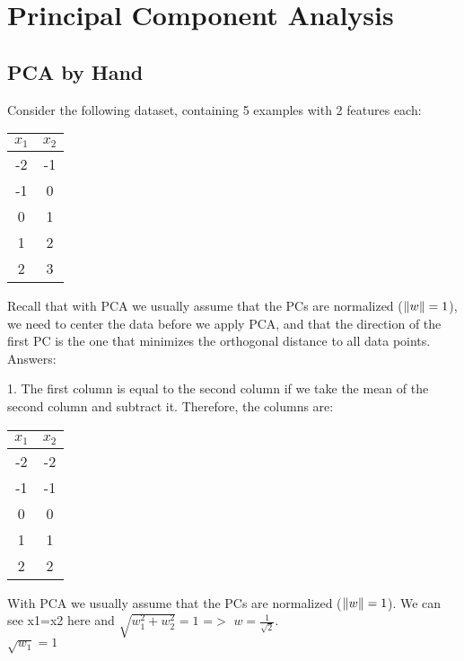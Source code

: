 \documentclass{article}
\begin{document}
\section{Principal Component Analysis}

\subsection{PCA by Hand}


Consider the following dataset, containing 5 examples with 2 features each:
\begin{center}
\begin{tabular}{cc}
$x_1$ & $x_2$\\
\hline
-2 & -1\\
-1 & 0\\
0 & 1\\
1 & 2\\
2 & 3\\
\end{tabular}
\end{center}
Recall that with PCA we usually assume that the PCs are normalized ($\|w\| = 1$), we need to center the data before we apply PCA, and that the direction of the first PC is the one that minimizes the orthogonal distance to all data points.
Answers:\\
{1. The first column is equal to the second column if we take the mean of the second column and subtract it. Therefore, the columns are:\\
\begin{center}
\begin{tabular}{cc}
$x_1$ & $x_2$\\
\hline
-2 & -2\\
-1 & -1\\
0 & 0\\
1 & 1\\
2 & 2\\
\end{tabular}
\end{center}
}

With PCA we usually assume that the PCs are normalized ($\|w\| = 1$). We can see x1=x2 here and $\sqrt{w_1^2 +w_2^2}=1$ =$>$ $w=\frac{1} {\sqrt{2}}$.\\ $\sqrt{w_1}=1$\\
\end{document}
